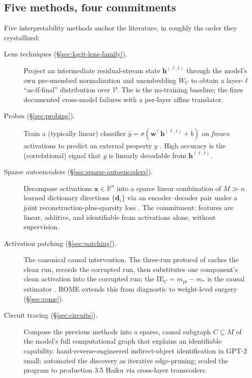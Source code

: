 \subsection{Five methods, four commitments}
\label{sec:five-methods}

Five interpretability methods anchor the literature, in roughly the
order they crystallized:

\begin{description}
  \item[Lens techniques (\S\ref{sec:logit-lens-family}).] Project an
    intermediate residual-stream state $\mathbf{h}^{(\ell, t)}$ through
    the model's own pre-unembed normalization and unembedding $W_U$ to
    obtain a layer-$\ell$ ``as-if-final'' distribution over
    $\mathcal{V}$. The \emph{}
    \citep{nostalgebraist2020-logit-lens} is the no-training baseline;
    the \emph{} \citep{belrose2023-tuned-lens} fixes
    documented cross-model failures with a per-layer affine translator.
  \item[Probes (\S\ref{sec:probing}).] Train a (typically linear)
    classifier $\hat y = \sigma(\mathbf{w}^\top \mathbf{h}^{(\ell, t)} +
    b)$ on \emph{frozen} activations to predict an external property
    $y$ \citep{alain-bengio-2017}. High accuracy is the (correlational)
    signal that $y$ is linearly decodable from $\mathbf{h}^{(\ell, t)}$.
  \item[Sparse autoencoders (\S\ref{sec:sparse-autoencoders}).]
    Decompose activations $\mathbf{x} \in \mathbb{R}^n$ into a sparse
    linear combination of $M \gg n$ learned dictionary directions
    $\{\mathbf{d}_i\}$ via an encoder--decoder pair under a joint
    reconstruction-plus-sparsity loss \citep{gao2024-topk-saes}. The
    commitment: features are linear, additive, and identifiable from
    activations alone, without supervision.
  \item[Activation patching (\S\ref{sec:patching}).] The canonical
    causal intervention. The three-run protocol of
    \citet{meng2022-rome} caches the clean run, records the corrupted
    run, then substitutes one component's clean activation into the
    corrupted run; the  $\mathrm{IE}_C = m_{\text{pt}} -
    m_{*}$ is the causal estimator \citep{zhang2023-apatching}. ROME
    \citep{meng2022-rome} extends this from diagnostic to weight-level
    surgery (\S\ref{sec:rome}).
  \item[Circuit tracing (\S\ref{sec:circuits}).] Compose the previous
    methods into a sparse, causal subgraph $C \subseteq M$ of the
    model's full computational graph that explains an identifiable
    capability. \citet{wang2022-ioi} hand-reverse-engineered
    indirect-object identification in GPT-2 small;
    \citet{conmy2023-acdc} automated the discovery as iterative
    edge-pruning; \citet{lindsey2025-circuit-tracing} scaled the
    program to production  3.5 Haiku via cross-layer transcoders.
\end{description}

